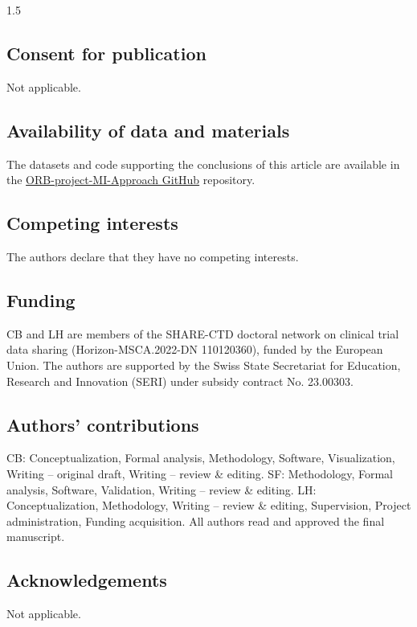 \documentclass{article}
\begin{document}
\begin{spacing}{1.5}
\subsection*{Consent for publication}
Not applicable.

\subsection*{Availability of data and materials}
The datasets and code supporting the conclusions of this article are available in the \href{https://github.com/cburgwin/ORB-project-MI-Approach/tree/main}{ORB-project-MI-Approach GitHub} repository.

\subsection*{Competing interests}
The authors declare that they have no competing interests.

\subsection*{Funding}
CB and LH are members of the SHARE-CTD doctoral network on clinical trial data sharing (Horizon-MSCA.2022-DN 110120360), funded by the European Union. The authors are supported by the Swiss State Secretariat for Education, Research and Innovation (SERI) under subsidy contract No. 23.00303.

\subsection*{Authors’ contributions}
\noindent
CB: Conceptualization, Formal analysis, Methodology, Software, Visualization, Writing – original draft, Writing – review \& editing. SF: Methodology, Formal analysis, Software, Validation, Writing – review \& editing. LH: Conceptualization, Methodology, Writing – review \& editing, Supervision, Project administration, Funding acquisition. All authors read and approved the final manuscript.

\subsection*{Acknowledgements}
Not applicable.


\sloppy
\printbibliography

\newpage


\end{spacing}
\end{document}
